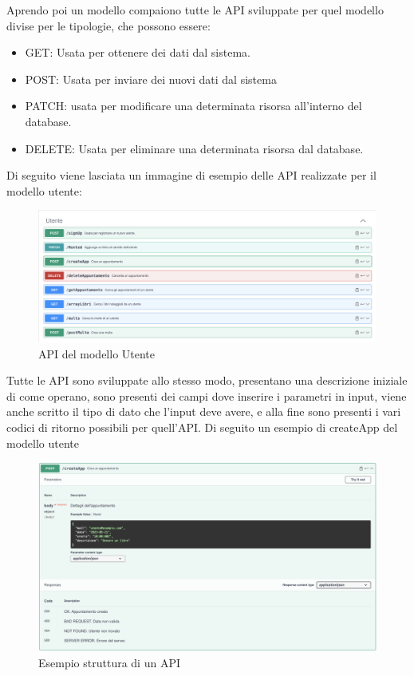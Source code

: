 \documentclass{article}
\begin{document}
Aprendo poi un modello compaiono tutte le API sviluppate per quel modello divise per le tipologie, che possono essere:
\begin{itemize}
    \item GET: Usata per ottenere dei dati dal sistema.
    \item POST: Usata per inviare dei nuovi dati dal sistema
    \item PATCH: usata per modificare una determinata risorsa all'interno del database.
    \item DELETE: Usata per eliminare una determinata risorsa dal database.
\end{itemize}
Di seguito viene lasciata un immagine di esempio delle API realizzate per il modello utente:
\begin{figure}[H]
    \centering
    \includegraphics[width=130mm]{D4/Images/SwaggerAPI.png}
    \caption{API del modello Utente}
\end{figure}

Tutte le API sono sviluppate allo stesso modo, presentano una descrizione iniziale di come operano, sono presenti dei campi dove inserire i parametri in input, viene anche scritto il tipo di dato che l'input deve avere, e alla fine sono presenti i vari codici di ritorno possibili per quell'API.
Di seguito un esempio di createApp del modello utente

\begin{figure}[H]
    \centering
    \includegraphics[width=130mm]{D4/Images/SwaggerTest.png}
    \caption{Esempio struttura di un API}
\end{figure}
\end{document}
